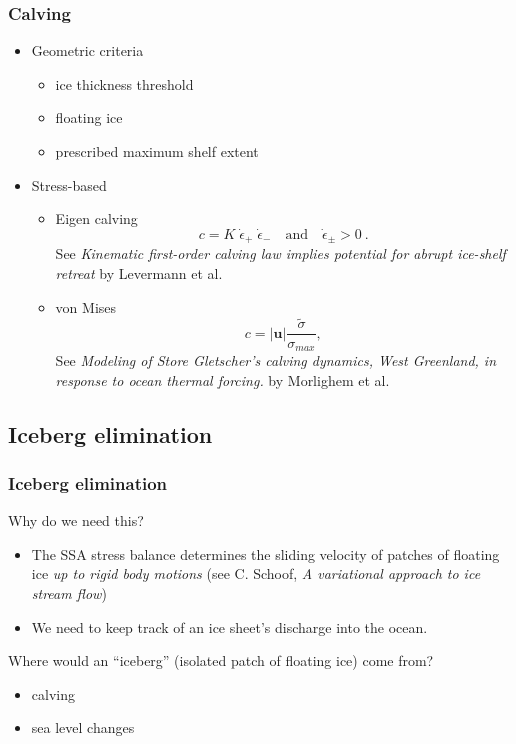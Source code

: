 \documentclass[hide notes,intlimits]{beamer}
\begin{document}
\begin{frame}
  \frametitle{Calving}

  \begin{itemize}
  \item Geometric criteria
    \begin{itemize}
    \item ice thickness threshold
    \item floating ice
    \item prescribed maximum shelf extent
    \end{itemize}
  \item Stress-based
    \begin{itemize}
    \item Eigen calving
      \begin{equation*}
        \label{eq:7}
        c = K\; \dot{\epsilon}_{+}\; \dot{\epsilon}_{-}\quad\text{and}\quad\dot{\epsilon}_{\pm}>0\:.
      \end{equation*}
      See \emph{Kinematic first-order calving law implies
      potential for abrupt ice-shelf retreat} by Levermann et al.
    \item von Mises
      \begin{equation*}
        \label{eq:8}
        c = |\mathbf{u}| \frac{\tilde{\sigma}}{\sigma_{max}},
      \end{equation*}
      See \emph{Modeling of Store Gletscher’s calving dynamics, West
        Greenland, in response to ocean thermal forcing.} by Morlighem
      et al.
    \end{itemize}
  \end{itemize}
\end{frame}


\subsection{Iceberg elimination}
\label{sec:iceberg-elimination}

\begin{frame}
  \frametitle{Iceberg elimination}

  Why do we need this?

  \begin{itemize}
  \item The SSA stress balance determines the sliding velocity of
    patches of floating ice \emph{up to rigid body motions} (see C.
    Schoof, \emph{A variational approach to ice stream flow})
  \item We need to keep track of an ice sheet's discharge into the
    ocean.
  \end{itemize}

  Where would an ``iceberg'' (isolated patch of floating ice) come
  from?
  \begin{itemize}
  \item calving
  \item sea level changes
  \end{itemize}
\end{frame}
\end{document}
